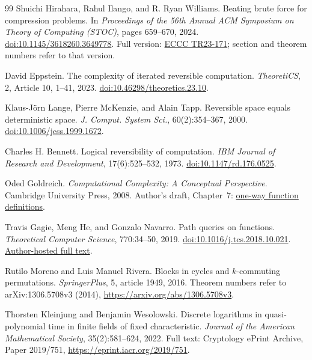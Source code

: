 \documentclass[11pt]{article}
\theoremstyle{definition}
\theoremstyle{remark}
\numberwithin{equation}{section}
\begin{document}
\begin{thebibliography}{99}
Shuichi Hirahara, Rahul Ilango, and R. Ryan Williams.
\newblock Beating brute force for compression problems.
\newblock In \emph{Proceedings of the 56th Annual ACM Symposium on Theory
of Computing (STOC)}, pages 659--670, 2024.
\newblock \href{https://doi.org/10.1145/3618260.3649778}{doi:10.1145/3618260.3649778}.
\newblock Full version: \href{https://eccc.weizmann.ac.il/report/2023/171/}{ECCC TR23-171};
section and theorem numbers refer to that version.

David Eppstein.
\newblock The complexity of iterated reversible computation.
\newblock \emph{TheoretiCS}, 2, Article 10, 1--41, 2023.
\newblock \href{https://doi.org/10.46298/theoretics.23.10}{doi:10.46298/theoretics.23.10}.

Klaus-J\"orn Lange, Pierre McKenzie, and Alain Tapp.
\newblock Reversible space equals deterministic space.
\newblock \emph{J. Comput. System Sci.}, 60(2):354--367, 2000.
\newblock \href{https://doi.org/10.1006/jcss.1999.1672}{doi:10.1006/jcss.1999.1672}.

Charles H. Bennett.
\newblock Logical reversibility of computation.
\newblock \emph{IBM Journal of Research and Development}, 17(6):525--532, 1973.
\newblock \href{https://doi.org/10.1147/rd.176.0525}{doi:10.1147/rd.176.0525}.

Oded Goldreich.
\newblock \emph{Computational Complexity: A Conceptual Perspective}.
\newblock Cambridge University Press, 2008.
\newblock Author's draft, Chapter~7:
\href{https://www.wisdom.weizmann.ac.il/~oded/CC/r3.pdf}{one-way function definitions}.

Travis Gagie, Meng He, and Gonzalo Navarro.
\newblock Path queries on functions.
\newblock \emph{Theoretical Computer Science}, 770:34--50, 2019.
\newblock \href{https://doi.org/10.1016/j.tcs.2018.10.021}{doi:10.1016/j.tcs.2018.10.021}.
\newblock \href{https://users.dcc.uchile.cl/~gnavarro/ps/tcs18.2.pdf}{Author-hosted full text}.

Rutilo Moreno and Luis Manuel Rivera.
\newblock Blocks in cycles and $k$-commuting permutations.
\newblock \emph{SpringerPlus}, 5, article 1949, 2016.
\newblock Theorem numbers refer to arXiv:1306.5708v3 (2014),
\url{https://arxiv.org/abs/1306.5708v3}.

Thorsten Kleinjung and Benjamin Wesolowski.
\newblock Discrete logarithms in quasi-polynomial time in finite fields of
fixed characteristic.
\newblock \emph{Journal of the American Mathematical Society},
35(2):581--624, 2022.
\newblock Full text: Cryptology ePrint Archive, Paper 2019/751,
\url{https://eprint.iacr.org/2019/751}.


\end{thebibliography}
\end{document}
